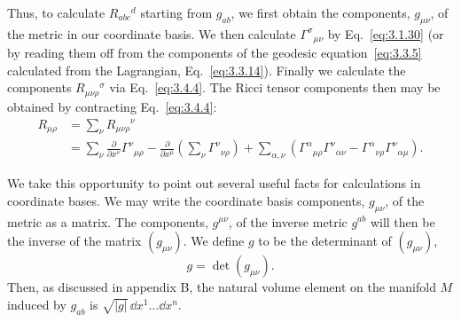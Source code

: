 Thus, to calculate $R_{abc}{}^d$ starting from $g_{ab}$, we first obtain the components, $g_{\mu\nu}$, of
the metric in our coordinate basis. We then calculate $\Gamma^\sigma{}_{\mu\nu}$ by Eq.~\eqref{eq:3.1.30} (or
by reading them off from the components of the geodesic equation~\eqref{eq:3.3.5} calculated
from the Lagrangian, Eq.~\eqref{eq:3.3.14}). Finally we calculate the components $R_{\mu\nu\rho}{}^\sigma$
via Eq.~\eqref{eq:3.4.4}. The Ricci tensor components then may be obtained by contracting Eq.~\eqref{eq:3.4.4}:
\begin{equation}
  \begin{aligned}
    R_{\mu\rho}
    &=\sum_\nu R_{\mu\nu\rho}{}^\nu\\
    &=\sum_\nu\frac{\partial}{\partial x^\nu}\Gamma^\nu{}_{\mu\rho}
    -\frac{\partial}{\partial x^\mu}\left(\sum_\nu\Gamma^\nu{}_{\nu\rho}\right)
    +\sum_{\alpha,\nu}\left(\Gamma^\alpha{}_{\mu\rho}\Gamma^\nu{}_{\alpha\nu}
    -\Gamma^\alpha{}_{\nu\rho}\Gamma^\nu{}_{\alpha\mu}\right).
  \end{aligned}
  \tag{3.4.5}\label{eq:3.4.5}
\end{equation}

We take this opportunity to point out several useful facts for calculations in
coordinate bases. We may write the coordinate basis components, $g_{\mu\nu}$, of the metric
as a matrix. The components, $g^{\mu\nu}$, of the inverse metric $g^{ab}$ will then be the inverse
of the matrix $(g_{\mu\nu})$. We define $g$ to be the determinant of $(g_{\mu\nu})$,
\begin{equation}
  g=\det(g_{\mu\nu}).
  \tag{3.4.6}\label{eq:3.4.6}
\end{equation}
Then, as discussed in appendix B, the natural volume element on the manifold $M$
induced by $g_{ab}$ is $\sqrt{|g|}\,\dd x^1\ldots \dd x^n$.

